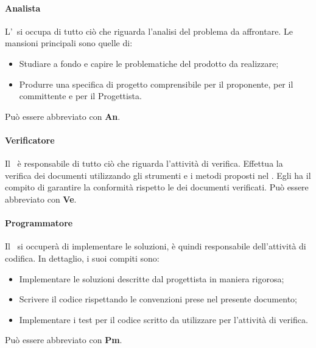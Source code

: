 \documentclass[../NormeDiProgetto.tex]{subfiles}
\begin{document}
\paragraph{Analista}
L'\analista\ si occupa di tutto ciò che riguarda l'analisi del problema da affrontare. Le mansioni principali sono quelle di:
\begin{itemize}
  \item Studiare a fondo e capire le problematiche del prodotto da realizzare;
  \item Produrre una specifica di progetto comprensibile per il proponente, per il committente e per il Progettista.
\end{itemize}
Può essere abbreviato con \textbf{An}.

\paragraph{Verificatore}
Il \verificatore\ è responsabile di tutto ciò che riguarda l'attività di verifica.
Effettua la verifica dei documenti utilizzando gli strumenti e i metodi proposti nel
\pianodiqualificav.
Egli ha il compito di garantire la conformità rispetto le \normediprogettov dei documenti verificati.
Può essere abbreviato con \textbf{Ve}.

\paragraph{Programmatore}
Il \programmatore\ si occuperà di implementare le soluzioni, è quindi
responsabile dell'attività di codifica. In dettaglio, i suoi compiti sono:
\begin{itemize}
  \item Implementare le soluzioni descritte dal progettista in maniera
  rigorosa;
  \item Scrivere il codice rispettando le convenzioni prese nel presente documento;
  \item Implementare i test per il codice scritto da utilizzare per l'attività di verifica.
\end{itemize}
Può essere abbreviato con \textbf{Pm}.
\end{document}
